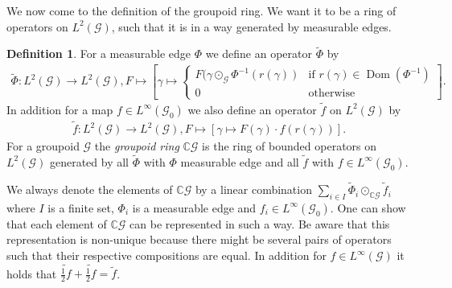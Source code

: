 \documentclass[12pt,a4paper]{scrartcl}
\theoremstyle{plain}
\theoremstyle{definition}
\newtheorem{Definition}[Theorem]{Definition}
\numberwithin{equation}{section}
\newcommand{\C}{\mathbb{C}} %
\newcommand{\2}{\mathbb{Z} / 2 \mathbb{Z}}
\newcommand{\G}{\mathcal{G}}
\newcommand{\1}{\bar{1}}
\newcommand{\0}{\bar{0}}
\newcommand{\Dom}{\operatorname{Dom}}
\begin{document}
We now come to the definition of the groupoid ring. We want it to be a ring of operators on	$L^2(\G)$,  such that it is in a way generated by measurable edges.
\begin{Definition}\label{groupoid_ring}
	For a measurable edge $\Phi$ we define an operator $\tilde \Phi$ by
	\begin{align*}
	\tilde \Phi\colon L^2(\G) \to L^2(\G), F \mapsto \left[\gamma \mapsto \begin{cases}
	F(\gamma \odot_{\G} \Phi^{-1}(r(\gamma)) & \text{if } r(\gamma) \in \Dom(\Phi^{-1}) \\
	0 & \text{otherwise}
	\end{cases} \right] .
	\end{align*}
	In addition for a map $f \in L^\infty (\G_0)$ we also define an operator $\tilde f$ on $L^2(\G)$ by
	\begin{align*}
	\tilde f\colon L^2(\G) \to L^2(\G), F \mapsto [\gamma \mapsto F(\gamma) \cdot f(r(\gamma))].
	\end{align*}
	For a groupoid $\G$ the \emph{groupoid ring} $\C\G$ is the ring of bounded operators on $L^2(\G)$ generated by all $\tilde{\Phi}$ with $\Phi$ measurable edge and all $\tilde{f}$ with $f \in L^\infty(\G_0)$.
\end{Definition}
We always denote the elements of $\C\G$ by a linear combination $\sum_{i \in I} \tilde \Phi_i \odot_{\C \G} \tilde f_i$ where $I$ is a finite set, $\Phi_i$ is a measurable edge and $f_i \in L^\infty(\G_0)$. One can show that each element of $\C \G$ can be represented in such a way. Be aware that this representation is non-unique because there might be several pairs of operators such that their respective compositions are equal. In addition for $f \in L^\infty(\G)$ it holds that $\widetilde{\frac{1}{2}f} + \widetilde{\frac{1}{2}f} = \tilde{f}$. 
\end{document}
